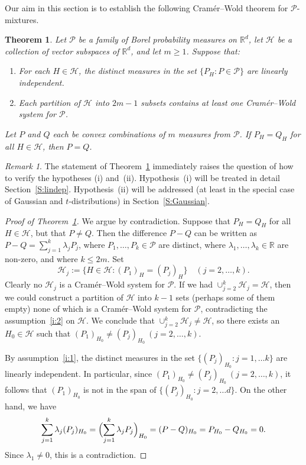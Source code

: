 \documentclass[11pt]{amsart}
\theoremstyle{plain}
\newtheorem{theorem}{Theorem}[section]
\theoremstyle{remark}
\newtheorem*{remark}{Remark}
\newcommand{\RR}{\mathbb{R}}
\newcommand{\cH}{\mathcal{H}}
\newcommand{\cP}{\mathcal{P}}
\begin{document}
Our aim in this section is to establish the following Cram\'er--Wold  theorem for $\cP$-mixtures.
	
\begin{theorem}\label{T:mixture}
Let $\cP$ be a family of Borel probability measures on $\RR^d$,
let $\cH$ be a collection of vector subspaces of $\RR^d$, and let $m\ge1$.
Suppose that:
\begin{enumerate}[\normalfont\rm(i)]
\item\label{i:1} 
For each $H\in\cH$, the distinct measures in the set
$\{P_H:P\in\cP\}$ are linearly independent.
\item\label{i:2} 
Each partition of $\cH$ into $2m-1$ subsets contains at least one Cram\'er--Wold system for $\cP$.
\end{enumerate}
Let $P$ and $Q$ each be convex combinations of $m$ measures from $\cP$.
If $P_H=Q_H$ for all $H\in\cH$, then $P=Q$.
\end{theorem}

\begin{remark}
The statement of Theorem~\ref{T:mixture} immediately
raises the question of how to verify the hypotheses (i) and~(ii).
Hypothesis~(i) will be treated in detail Section~\ref{S:lindep}.
Hypothesis~(ii) will be addressed (at least in the special case of 
Gaussian and $t$-distributions) in Section~\ref{S:Gaussian}.
\end{remark}
	
\begin{proof}[Proof of Theorem~\ref{T:mixture}]
We argue by contradiction. 
Suppose that $P_H=Q_H$ for all $H\in\cH$, but that $P\ne Q$. 
Then the difference $P-Q$ can be written as 
$P-Q=\sum_{j=1}^k\lambda_j P_j$, 
where $P_1,\dots,P_k\in\cP$ are distinct,  
where $\lambda_1,\dots,\lambda_k\in\RR$  are non-zero,
and where $k\le 2m$. Set
\[
\cH_j:=\{H\in\cH: (P_{1})_H= (P_{j})_H\} \quad(j=2,\dots,k).
\]
Clearly no $\cH_j$ is a Cram\'er--Wold system for $\cP$.
If we had $\cup_{j=2}^k \cH_j=\cH$, then we could construct a partition
of $\cH$ into $k-1$ sets (perhaps some of them empty) none of which is
a Cram\'er--Wold system for $\cP$, contradicting the assumption~\eqref{i:2}
on $\cH$.
We conclude that $\cup_{j=2}^k \cH_j\ne\cH$, so there exists an $H_0\in\cH$
such that $(P_{1})_{H_0}\ne (P_{j})_{H_0}~(j=2,\dots,k)$.
		
By assumption~\eqref{i:1},
the distinct measures in the set $\{(P_j)_{H_0}:j=1,\dots k\}$
are linearly independent. In particular, since $(P_{1})_{H_0}\ne (P_{j})_{H_0}~(j=2,\dots,k)$,
it follows that $(P_{1})_{H_0}$ is not in the span of $\{(P_j)_{H_0}:j=2,\dots d\}$. 
On the other hand, we have
\[
\sum_{j=1}^k\lambda_j(P_j)_{H_0}
=\Bigl(\sum_{j=1}^k\lambda_j P_j\Bigr)_{H_0}=(P-Q)_{H_0}=P_{H_0}-Q_{H_0}=0.
\]
Since $\lambda_1\ne0$, this is a contradiction.
\end{proof}
	
\end{document}
